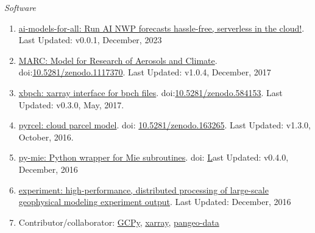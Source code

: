 \documentclass[11pt,letterpaper]{article}
\newcommand{\mhead}[1]{\leavevmode\marginpar{\sffamily\footnotesize #1}}
\begin{document}
\bigskip
\emph{Software}
\medskip
\begin{enumerate}[itemindent=-10pt]

\item \href{https://github.com/darothen/ai-models-for-all}{ai-models-for-all: Run AI NWP forecasts hassle-free, serverless in the cloud!}. Last Updated: v0.0.1, December, 2023

\item \href{https://github.mit.edu/marc/marc_cesm}{MARC: Model for Research of Aerosols and Climate}. doi:\href{https://doi.org/10.5281/zenodo.1117370}{10.5281/zenodo.1117370}. Last Updated: v1.0.4, December, 2017

\item \href{https://github.com/darothen/xbpch}{xbpch: xarray interface for bpch files}. doi:\href{https://doi.org/10.5281/zenodo.584153}{10.5281/zenodo.584153}. Last Updated: v0.3.0, May, 2017.

\item \href{https://github.com/darothen/pyrcel}{pyrcel: cloud parcel model}. doi: \href{https://doi.org/10.5281/zenodo.163265}{10.5281/zenodo.163265}. Last Updated: v1.3.0, October, 2016.

\item \href{https://github.com/darothen/py-mie}{py-mie: Python wrapper for Mie subroutines}. doi: \href{http://doi.org/10.5281/zenodo.192510} Last Updated: v0.4.0, December, 2016

\item \href{https://github.com/darothen/experiment}{experiment: high-performance, distributed processing of large-scale geophysical modeling experiment output}. Last Updated: December, 2016

\item Contributor/collaborator: \href{https://bitbucket.org/gcst/gcpy/}{GCPy}, \href{https://github.com/pydata/xarray}{xarray}, \href{https://github.com/pangeo-data/pangeo}{pangeo-data}

\end{enumerate}


\bigskip
\mhead{Presentations \newline and \newline Talks}%
\end{document}
